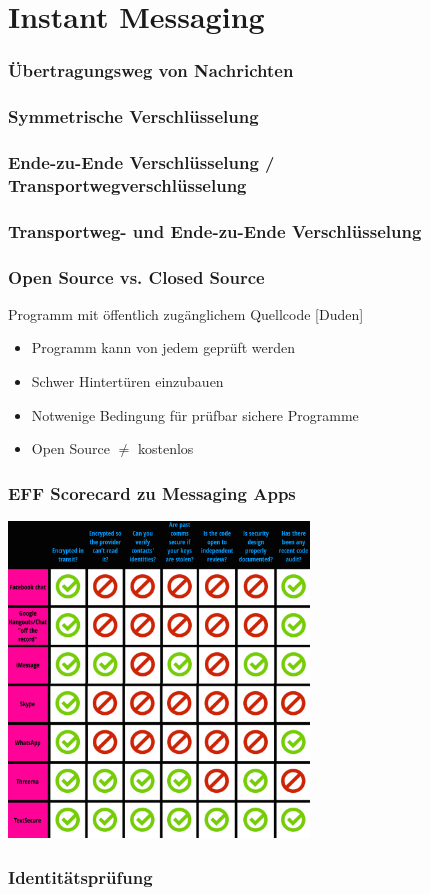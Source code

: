 \section{Instant Messaging}


\begin{frame}
  \frametitle{Übertragungsweg von Nachrichten}
\end{frame}

\begin{frame}
  \frametitle{Symmetrische Verschlüsselung}
\end{frame}

\begin{frame}
  \frametitle{Ende-zu-Ende Verschlüsselung / Transportwegverschlüsselung}
\end{frame}

\begin{frame}
  \frametitle{Transportweg- und Ende-zu-Ende Verschlüsselung}
\end{frame}

\begin{frame}
  \frametitle{Open Source vs. Closed Source}
  \begin{definition}
   Programm mit öffentlich zugänglichem Quellcode \hfill \tiny [Duden]
  \end{definition}

  \begin{itemize}
   \item Programm kann von jedem geprüft werden
   \item Schwer Hintertüren einzubauen
   \item Notwenige Bedingung für prüfbar sichere Programme
   \item Open Source $\neq$ kostenlos
  \end{itemize}

\end{frame}


\begin{frame}
  \frametitle{EFF Scorecard zu Messaging Apps}
  \center
  \includegraphics[width=0.6\textwidth]{figures/eff_scorecard.png}
\end{frame}

\begin{frame}
  \frametitle{Identitätsprüfung}
\end{frame}
